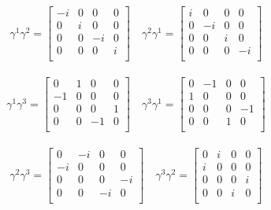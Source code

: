 \documentclass{article}
\begin{document}
\begin{align*}
\gamma^1 \gamma^2 = \begin{bmatrix}
 -i  &  0  &  0  &  0  \\
 0  &  i  &  0  &  0  \\
 0  &  0  &  -i  &  0  \\
 0  &  0  &  0  &  i  \\
\end{bmatrix} \quad
\gamma^2 \gamma^1 = \begin{bmatrix}
 i  &  0  &  0  &  0  \\
 0  &  -i  &  0  &  0  \\
 0  &  0  &  i  &  0  \\
 0  &  0  &  0  &  -i  \\
\end{bmatrix}
\end{align*}

\begin{align*}
\gamma^1 \gamma^3 = \begin{bmatrix}
 0  &  1  &  0  &  0  \\
 -1  &  0  &  0  &  0  \\
 0  &  0  &  0  &  1  \\
 0  &  0  &  -1  &  0  \\
\end{bmatrix} \quad
\gamma^3 \gamma^1 = \begin{bmatrix}
 0  &  -1  &  0  &  0  \\
 1  &  0  &  0  &  0  \\
 0  &  0  &  0  &  -1  \\
 0  &  0  &  1  &  0  \\
\end{bmatrix}
\end{align*}

\begin{align*}
\gamma^2 \gamma^3 = \begin{bmatrix}
 0  &  -i  &  0  &  0  \\
 -i  &  0  &  0  &  0  \\
 0  &  0  &  0  &  -i  \\
 0  &  0  &  -i  &  0  \\
\end{bmatrix} \quad
\gamma^3 \gamma^2 = \begin{bmatrix}
 0  &  i  &  0  &  0  \\
 i  &  0  &  0  &  0  \\
 0  &  0  &  0  &  i  \\
 0  &  0  &  i  &  0  \\
\end{bmatrix}
\end{align*}
\end{document}

